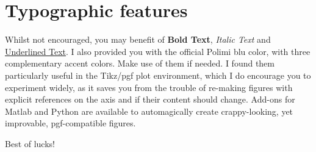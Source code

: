 \section{Typographic features}
\label{sec: Typographic features}

Whilst not encouraged, you may benefit of \textbf{Bold Text}, \textit{Italic Text} and \underline{Underlined Text}. I also provided you with the official \textcolor{Livery}{Polimi blu} color, with \textcolor{Accent1}{three} \textcolor{Accent2}{complementary} \textcolor{Accent3}{accent} colors. Make use of them if needed. I found them particularly useful in the Tikz/pgf plot environment, which I do encourage you to experiment widely, as it saves you from the trouble of re-making figures with explicit references on the axis and if their content should change. Add-ons for Matlab and Python are available to automagically create crappy-looking, yet improvable, pgf-compatible figures.

Best of lucks!
